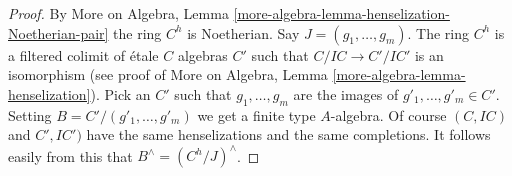 \documentclass[10pt,a4paper]{amsart}
\theoremstyle{plain}
\theoremstyle{definition}
\theoremstyle{remark}
\numberwithin{equation}{subsection}
\begin{document}
\begin{proof}
By More on Algebra, Lemma
\ref{more-algebra-lemma-henselization-Noetherian-pair}
the ring $C^h$ is Noetherian. Say $J = (g_1, \ldots, g_m)$.
The ring $C^h$ is a filtered colimit of \'etale $C$ algebras $C'$
such that $C/IC \to C'/IC'$ is an isomorphism
(see proof of More on Algebra, Lemma \ref{more-algebra-lemma-henselization}).
Pick an $C'$ such that $g_1, \ldots, g_m$ are the
images of $g'_1, \ldots, g'_m \in C'$.
Setting $B = C'/(g'_1, \ldots, g'_m)$ we get a finite
type $A$-algebra. Of course $(C, IC)$ and $C', IC')$ have
the same henselizations and the same completions.
It follows easily from this that $B^\wedge = (C^h/J)^\wedge$.
\end{proof}
\end{document}
